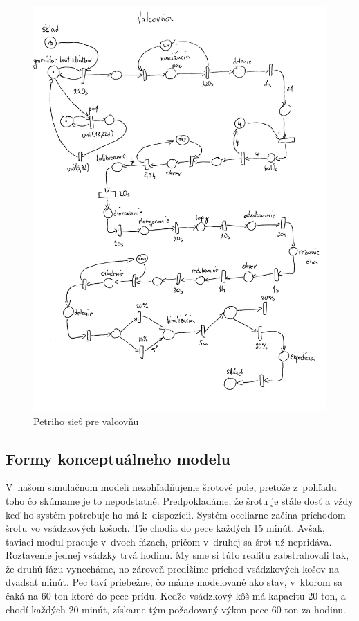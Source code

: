 \documentclass[]{article}
\begin{document}
\begin{figure}[h!]
	\includegraphics[width=\textwidth]{pn_valcovna.jpg}
	\caption{Petriho sieť pre valcovňu}
\end{figure}

\newpage
	
\subsection{Formy konceptuálneho modelu}
V~našom simulačnom modeli nezohľadňujeme šrotové pole, pretože z~pohľadu toho čo skúmame je to nepodstatné. Predpokladáme, že šrotu je stále dosť a vždy keď ho systém potrebuje ho má k~dispozícii. Systém oceliarne začína príchodom šrotu vo vsádzkových košoch. Tie chodia do pece každých 15 minút. Avšak, taviaci modul pracuje v~dvoch fázach, pričom v~druhej sa šrot už nepridáva. Roztavenie jednej vsádzky trvá hodinu. My sme si túto realitu zabstrahovali tak, že druhú fázu vynecháme, no zároveň predĺžime príchod vsádzkových košov na dvadsať minút. Pec taví priebežne, čo máme modelované ako stav, v~ktorom sa čaká na 60 ton ktoré do pece prídu. Keďže vsádzkový kôš má kapacitu 20 ton, a chodí každých 20 minút, získame tým požadovaný výkon pece 60 ton za hodinu.
\end{document}
